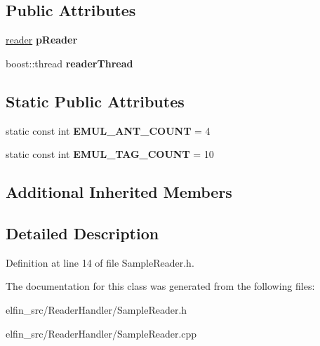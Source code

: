 \subsection*{Public Attributes}
\begin{DoxyCompactItemize}
\item 
\hypertarget{class_e_l_f_i_n_1_1_sample_reader_a0f18d5673a11788a4f2169ac33eed45f}{\hyperlink{struct_e_l_f_i_n_1_1_sample_reader_1_1reader}{reader} {\bfseries p\-Reader}}\label{class_e_l_f_i_n_1_1_sample_reader_a0f18d5673a11788a4f2169ac33eed45f}

\item 
\hypertarget{class_e_l_f_i_n_1_1_sample_reader_a7346ac061ad63e57657f077a768ceb45}{boost\-::thread {\bfseries reader\-Thread}}\label{class_e_l_f_i_n_1_1_sample_reader_a7346ac061ad63e57657f077a768ceb45}

\end{DoxyCompactItemize}
\subsection*{Static Public Attributes}
\begin{DoxyCompactItemize}
\item 
\hypertarget{class_e_l_f_i_n_1_1_sample_reader_a33fe5f05735397e88e3b694d57e46375}{static const int {\bfseries E\-M\-U\-L\-\_\-\-A\-N\-T\-\_\-\-C\-O\-U\-N\-T} = 4}\label{class_e_l_f_i_n_1_1_sample_reader_a33fe5f05735397e88e3b694d57e46375}

\item 
\hypertarget{class_e_l_f_i_n_1_1_sample_reader_add50170d9f5c5f53c323d8f5b3823e83}{static const int {\bfseries E\-M\-U\-L\-\_\-\-T\-A\-G\-\_\-\-C\-O\-U\-N\-T} = 10}\label{class_e_l_f_i_n_1_1_sample_reader_add50170d9f5c5f53c323d8f5b3823e83}

\end{DoxyCompactItemize}
\subsection*{Additional Inherited Members}


\subsection{Detailed Description}


Definition at line 14 of file Sample\-Reader.\-h.



The documentation for this class was generated from the following files\-:\begin{DoxyCompactItemize}
\item 
elfin\-\_\-src/\-Reader\-Handler/Sample\-Reader.\-h\item 
elfin\-\_\-src/\-Reader\-Handler/Sample\-Reader.\-cpp\end{DoxyCompactItemize}
